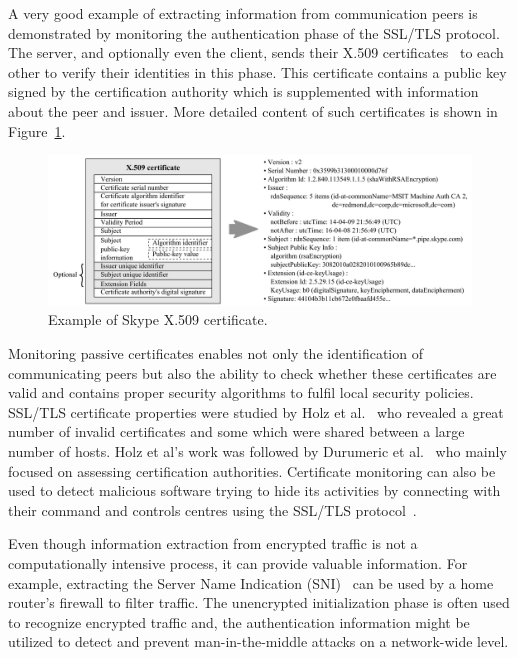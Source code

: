A very good example of extracting information from communication peers is demonstrated by monitoring the authentication phase of the SSL/TLS protocol. The server, and optionally even the client, sends their X.509 certificates~\cite{rfc5280} to each other to verify their identities in this phase. This certificate contains a public key signed by the certification authority which is supplemented with information about the peer and issuer. More detailed content of such certificates is shown in Figure~\ref{fig:certificates-contents}.

\begin{figure}[!ht]
	\begin{center}
		\includegraphics[width=0.9\linewidth]{figures/certificate}
		\caption{Example of Skype X.509 certificate.} \label{fig:certificates-contents}
	\end{center}
\end{figure}

Monitoring passive certificates enables not only the identification of communicating peers but also the ability to check whether these certificates are valid and contains proper security algorithms to fulfil local security policies. SSL/TLS certificate properties were studied by Holz et al.~\cite{Holz-2011-SSL} who revealed a great number of invalid certificates and some which were shared between a large number of hosts. Holz et al's work was followed by Durumeric et al.~\cite{Durumeric-2013-Analysis} who mainly focused on assessing certification authorities. Certificate monitoring can also be used to detect malicious software trying to hide its activities by connecting with their command and controls centres using the SSL/TLS protocol~\cite{ssl-certificates-blacklist}.

Even though information extraction from encrypted traffic is not a computationally intensive process, it can provide valuable information. For example, extracting the Server Name Indication (SNI)~\cite{rfc4366} can be used by a home router's firewall to filter traffic. The unencrypted initialization phase is often used to recognize encrypted traffic and, the authentication information might be utilized to detect and prevent man-in-the-middle attacks on a network-wide level.

